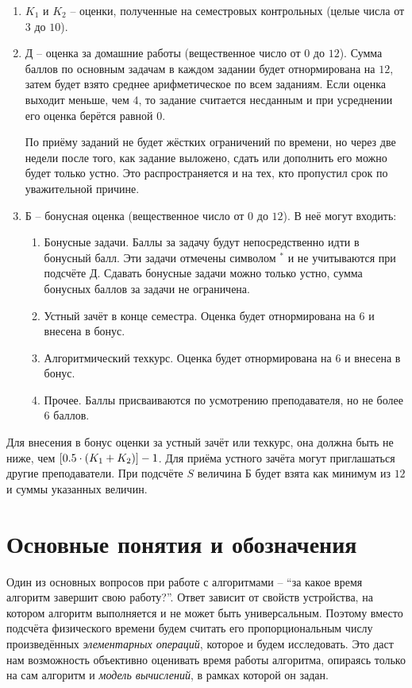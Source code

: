 \documentclass{article}
\begin{document}
\begin{enumerate}
    \item $K_1$ и $K_2$ -- оценки, полученные на семестровых контрольных (целые числа от $3$ до $10$). 
    \item Д -- оценка за домашние работы (вещественное число от $0$ до $12$). Сумма баллов по основным задачам в каждом задании будет отнормирована на $12$, затем будет взято среднее арифметическое по всем заданиям. Если оценка выходит меньше, чем $4$, то задание считается несданным и при усреднении его оценка берётся равной $0$. 
    
    По приёму заданий не будет жёстких ограничений по времени, но через две недели после того, как задание выложено, сдать или дополнить его можно будет только устно. Это распространяется и на тех, кто пропустил срок по уважительной причине. 
    \item Б -- бонусная оценка (вещественное число от $0$ до $12$). В неё могут входить:
    \begin{enumerate}
        \item Бонусные задачи. Баллы за задачу будут непосредственно идти в бонусный балл. Эти задачи отмечены символом $^*$ и не учитываются при подсчёте Д. Сдавать бонусные задачи можно только устно, сумма бонусных баллов за задачи не ограничена.
        \item Устный зачёт в конце семестра. Оценка будет отнормирована на $6$ и внесена в бонус. 
        \item Алгоритмический техкурс. Оценка будет отнормирована на $6$ и внесена в бонус.
        \item Прочее. Баллы присваиваются по усмотрению преподавателя, но не более $6$ баллов.
    \end{enumerate}
\end{enumerate}

Для внесения в бонус оценки за устный зачёт или техкурс, она должна быть не ниже, чем $[0.5 \cdot (K_1 + K_2)] - 1$. Для приёма устного зачёта могут приглашаться другие преподаватели. При подсчёте $S$ величина Б будет взята как минимум из $12$ и суммы указанных величин.

\section*{Основные понятия и обозначения}

Один из основных вопросов при работе с алгоритмами -- ``за какое время алгоритм завершит свою работу?''. Ответ зависит от свойств устройства, на котором алгоритм выполняется и не может быть универсальным. Поэтому вместо подсчёта физического времени будем считать его пропорциональным числу произведённых \textit{элементарных операций}, которое и будем исследовать. Это даст нам возможность объективно оценивать время работы алгоритма, опираясь только на сам алгоритм и \textit{модель вычислений}, в рамках которой он задан.
\end{document}
